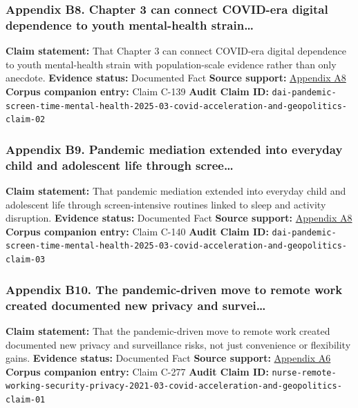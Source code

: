 \documentclass[
  american,
  11pt,
  letterpaper,
]{article}
\begin{document}
\subsubsection{Appendix B8. Chapter 3 can connect COVID-era digital
dependence to youth mental-health
strain\ldots{}}\label{ch-03-appendix-b8-chapter-3-can-connect-covid-era-digital-dependence-to-youth-mental-health-strain}

\textbf{Claim statement:} That Chapter 3 can connect COVID-era digital
dependence to youth mental-health strain with population-scale evidence
rather than only anecdote. \textbf{Evidence status:} Documented Fact
\textbf{Source support:}
\hyperref[ch-03-appendix-a8-excessive-screen-time-is-associated-with-mental-health-problems-and-adhd-in-us-children-and-adolescents-physical-activity-and-sleep-as-parallel-mediators]{Appendix
A8} \textbf{Corpus companion entry:} Claim C-139 \textbf{Audit Claim
ID:}
\texttt{dai-pandemic-screen-time-mental-health-2025-03-covid-acceleration-and-geopolitics-claim-02}

\subsubsection{Appendix B9. Pandemic mediation extended into everyday
child and adolescent life through
scree\ldots{}}\label{ch-03-appendix-b9-pandemic-mediation-extended-into-everyday-child-and-adolescent-life-through-scree}

\textbf{Claim statement:} That pandemic mediation extended into everyday
child and adolescent life through screen-intensive routines linked to
sleep and activity disruption. \textbf{Evidence status:} Documented Fact
\textbf{Source support:}
\hyperref[ch-03-appendix-a8-excessive-screen-time-is-associated-with-mental-health-problems-and-adhd-in-us-children-and-adolescents-physical-activity-and-sleep-as-parallel-mediators]{Appendix
A8} \textbf{Corpus companion entry:} Claim C-140 \textbf{Audit Claim
ID:}
\texttt{dai-pandemic-screen-time-mental-health-2025-03-covid-acceleration-and-geopolitics-claim-03}

\subsubsection{Appendix B10. The pandemic-driven move to remote work
created documented new privacy and
survei\ldots{}}\label{ch-03-appendix-b10-the-pandemic-driven-move-to-remote-work-created-documented-new-privacy-and-survei}

\textbf{Claim statement:} That the pandemic-driven move to remote work
created documented new privacy and surveillance risks, not just
convenience or flexibility gains. \textbf{Evidence status:} Documented
Fact \textbf{Source support:}
\hyperref[ch-03-appendix-a6-remote-working-pre-and-post-covid-19-an-analysis-of-new-threats-and-risks-to-security-and-privacy]{Appendix
A6} \textbf{Corpus companion entry:} Claim C-277 \textbf{Audit Claim
ID:}
\texttt{nurse-remote-working-security-privacy-2021-03-covid-acceleration-and-geopolitics-claim-01}
\end{document}
